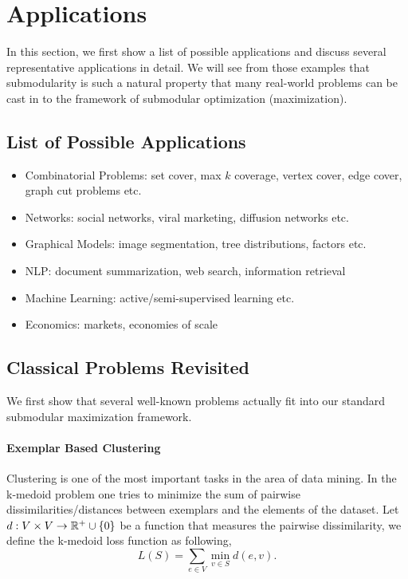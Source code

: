 \section{Applications}
\label{sec:applications}
In this section, we first show a list of possible applications and discuss several representative applications in detail. We will see from those examples that submodularity is such a natural property  that many real-world problems can be cast in to the framework of submodular optimization (maximization).


\subsection{List of Possible Applications}
\begin{itemize}
\item Combinatorial Problems: set cover, max $k$ coverage, vertex cover, edge cover, graph cut problems etc.
\item Networks: social networks, viral marketing, diffusion networks etc.
\item Graphical Models: image segmentation, tree distributions, factors etc.
\item NLP: document summarization, web search, information retrieval
\item Machine Learning: active/semi-supervised learning etc.
\item Economics: markets, economies of scale
\end{itemize}



\subsection{Classical Problems Revisited}
\label{sec:classical}
We first show that several well-known problems actually fit into our standard submodular maximization framework.

\paragraph{Exemplar Based Clustering}
Clustering is one of the most important tasks in the area of data mining. In the k-medoid problem \cite{KR09} one tries to minimize the sum of pairwise dissimilarities/distances between exemplars and the elements of the dataset. Let $d: V \times V \rightarrow \mathbb{R}^+\cup\{0\}$ be a function that measures the pairwise dissimilarity, we define the k-medoid loss function as following,
$$L(S) = \sum_{e\in V} \min_{v\in S} d(e, v).$$

